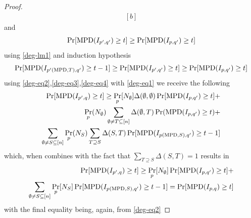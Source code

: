 \begin{proof}
\begin{equation}
\begin{aligned}[b]
	\end{aligned}\end{equation}
	and
	\begin{equation}
		\label{deg-eq3}
		\Pr[\mathrm{MPD}(I_{p',q'})\geq t]\geq\Pr[\mathrm{MPD}(I_{p,q'})\geq t]
	\end{equation}
	using \autoref{deg-lm1} and induction hypothesis
	\begin{equation}
		\label{deg-eq4}
		\Pr[\mathrm{MPD}(I_{p'(\mathrm{MPD},T),q'})\geq t-1]\geq\Pr[\mathrm{MPD}(I_{p',q'})\geq t]\geq\Pr[\mathrm{MPD}(I_{p,q'})\geq t]
	\end{equation}
	using \autoref{deg-eq2},\autoref{deg-eq3},\autoref{deg-eq4} with \autoref{deg-eq1} we receive the following
	\begin{align*}
		\Pr[\mathrm{MPD}(I_{p',q})\geq t]\geq \Pr_p[N_\emptyset]\Delta(\emptyset,\emptyset)\Pr[\mathrm{MPD}(I_{p,q'})\geq t]+\\ \Pr_p(N_\emptyset)\sum\limits_{\emptyset\neq T\subseteq[n]}\Delta(\emptyset,T)\Pr(\mathrm{MPD}(I_{p,q'})\geq t)+\\ \sum\limits_{\emptyset\neq S\subseteq[n]}\Pr_p(N_S)\sum\limits_{T\supseteq S}\Delta(S,T)\Pr[\mathrm{MPD}(I_{p(\mathrm{MPD},S),q'})\geq t-1]
	\end{align*}
	which, when combines with the fact that $\sum\limits_{T\supseteq S}\Delta(S,T)=1$ results in
	\begin{align*}
		\Pr[\mathrm{MPD}(I_{p',q})\geq t]\geq\Pr_p[N_\emptyset]\Pr[\mathrm{MPD}(I_{p,q'})\geq t]+\\\sum\limits_{\emptyset\neq S\subseteq[n]}\Pr_p[N_S]\Pr[\mathrm{MPD}(I_{p(\mathrm{MPD},S),q'})\geq t-1]=\Pr[\mathrm{MPD}(I_{p,q})\geq t]
	\end{align*}
	with the final equality being, again, from \autoref{deg-eq2}
\end{proof}

